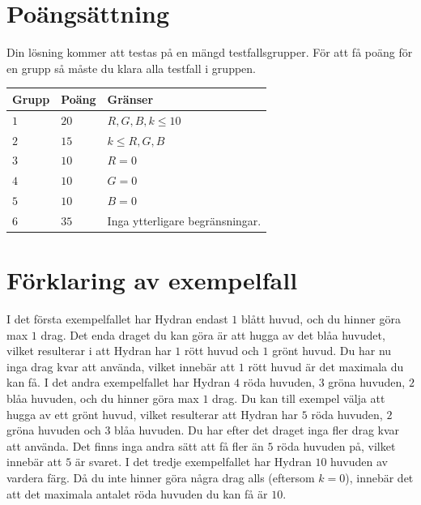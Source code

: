 \section*{Poängsättning}
Din lösning kommer att testas på en mängd testfallsgrupper.
För att få poäng för en grupp så måste du klara alla testfall i gruppen.

\noindent
\begin{tabular}{| l | l | p{12cm} |}
  \hline
  \textbf{Grupp} & \textbf{Poäng} & \textbf{Gränser} \\ \hline
  $1$    & $20$       & $R,G,B,k \leq 10$ \\ \hline
  $2$    & $15$       & $k \leq R,G,B$ \\ \hline
  $3$    & $10$       & $R = 0$ \\ \hline
  $4$    & $10$       & $G = 0$ \\ \hline
  $5$    & $10$       & $B = 0$ \\ \hline
  $6$    & $35$       & Inga ytterligare begränsningar. \\ \hline
\end{tabular}

\section*{Förklaring av exempelfall}
I det första exempelfallet har Hydran endast $1$ blått huvud, och du hinner göra max $1$ drag. Det enda draget du kan göra är att hugga av det blåa huvudet, vilket resulterar i att Hydran har $1$ rött huvud och $1$ grönt huvud. Du har nu inga drag kvar att använda, vilket innebär att $1$ rött huvud är det maximala du kan få.
\newline
I det andra exempelfallet har Hydran $4$ röda huvuden, $3$ gröna huvuden, $2$ blåa huvuden, och du hinner göra max $1$ drag. Du kan till exempel välja att hugga av ett grönt huvud, vilket resulterar att Hydran har $5$ röda huvuden, $2$ gröna huvuden och $3$ blåa huvuden. Du har efter det draget inga fler drag kvar att använda. Det finns inga andra sätt att få fler än $5$ röda huvuden på, vilket innebär att $5$ är svaret.
\newline
I det tredje exempelfallet har Hydran $10$ huvuden av vardera färg. Då du inte hinner göra några drag alls (eftersom $k = 0$), innebär det att det maximala antalet röda huvuden du kan få är $10$.
